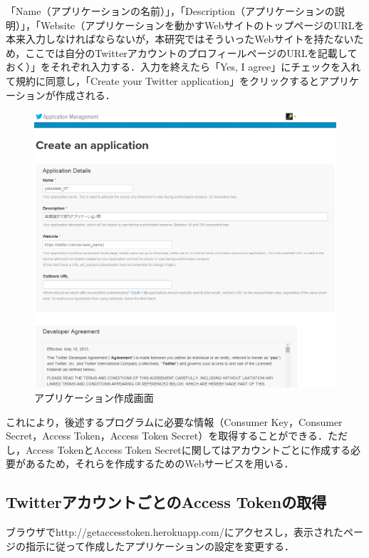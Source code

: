 「Name（アプリケーションの名前）」，「Description（アプリケーションの説明）」，「Website（アプリケーションを動かすWebサイトのトップページのURLを本来入力しなければならないが，本研究ではそういったWebサイトを持たないため，ここでは自分のTwitterアカウントのプロフィールページのURLを記載しておく）」をそれぞれ入力する．入力を終えたら「Yes, I agree」にチェックを入れて規約に同意し，「Create your Twitter application」をクリックするとアプリケーションが作成される．%

\begin{figure}[H]
\centering
\includegraphics[width=13cm]{create_an_application.PNG}
\caption{アプリケーション作成画面}\label{createapp}
\end{figure}

これにより，後述するプログラムに必要な情報（Consumer Key，Consumer Secret，Access Token，Access Token Secret）を取得することができる．ただし，Access TokenとAccess Token Secretに関してはアカウントごとに作成する必要があるため，それらを作成するためのWebサービスを用いる．

\subsection{TwitterアカウントごとのAccess Tokenの取得}
ブラウザでhttp://getaccesstoken.herokuapp.com/にアクセスし，表示されたページの指示に従って作成したアプリケーションの設定を変更する．
	
